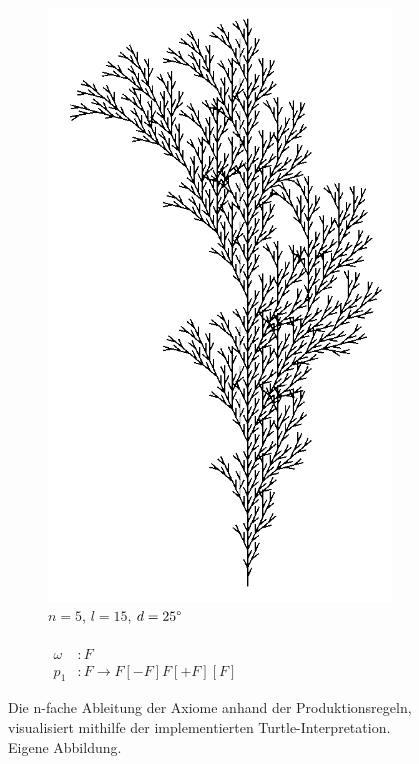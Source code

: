 \begin{figure} [hbtp]
\begin{subfigure}[t]{.4\textwidth}
		\includegraphics[width=\linewidth]{images/Branching2_N5L15D25.png}
		\caption{$n=5$, $l=15$, $d=25\degree$\\ \\
			$\begin{array}{ll}
				\omega & : F \\
				p_1 & : F \rightarrow F[-F]F[+F][F]
			\end{array}
			\label{eq:ProdBranching2}$\\
			\cite[S.78]{PCGiG:16}
		}
		\label{fig:Branching2L15D25}
	\end{subfigure}

	\caption{Die n-fache Ableitung der Axiome anhand der Produktionsregeln, visualisiert mithilfe der implementierten Turtle-Interpretation. Eigene Abbildung.}
	\label{fig:BranchingLSystems}
\end{figure}

